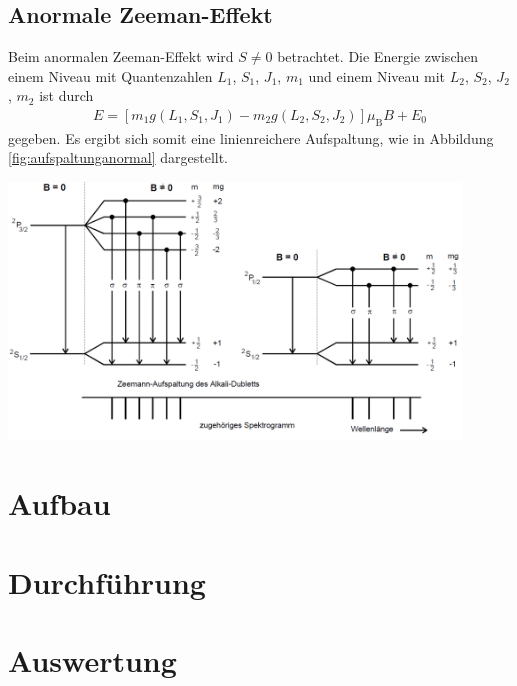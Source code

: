 \documentclass[captions=tableheading]{scrartcl}
\newcommand{\indx}[1]{\text{#1}}
\begin{document}
\subsection{Anormale Zeeman-Effekt}
Beim anormalen Zeeman-Effekt wird $S\neq 0$ betrachtet. 
Die Energie zwischen einem Niveau mit Quantenzahlen $L_1$, $S_1$, $J_1$, $m_1$ und einem Niveau mit $L_2$, $S_2$, $J_2$, $m_2$ ist durch 
\begin{align}
E=\left[ m_1 g\left(L_1,S_1,J_1 \right) - m_2 g\left(L_2,S_2,J_2 \right) \right] \mu_\indx{B}B+E_0
\end{align}
gegeben.
Es ergibt sich somit eine linienreichere Aufspaltung, wie in Abbildung \ref{fig:aufspaltunganormal} dargestellt.
\begin{center}
	\includegraphics[width=12cm]{images/aufspaltunganormal.png}
	\label{fig:aufspaltunganormal}
\end{center}
\section{Aufbau}


\section{Durchführung}


\section{Auswertung}
\end{document}
